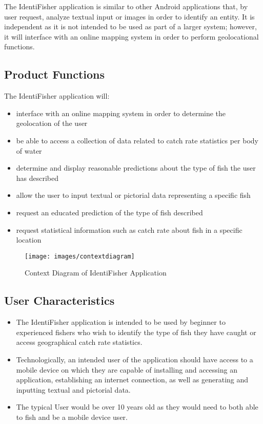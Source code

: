 \documentclass{article}
\begin{document}
The IdentiFisher application is similar to other Android applications that,
by user request, analyze textual input or images in order to identify
an entity. It is independent as it is not intended to be used as part
of a larger system; however, it will interface with an online mapping
system in order to perform geolocational functions.

\subsection{Product Functions}
The IdentiFisher application will: 
\begin{itemize}
	\item
	interface with an online mapping system in order to determine the geolocation of the user
	\item
	be able to access a collection of data related to catch rate statistics per body of water
	\item
	determine and display reasonable predictions about the type of fish the user has described
	\item
	allow the user to input textual or pictorial data representing a specific fish
	\item
	request an educated prediction of the type of fish described
	\item
	request statistical information such as catch rate about fish in a specific location
\end{itemize} 


\begin{figure}[H]
	\texttt{[image: images/contextdiagram]}
	\caption{Context Diagram of IdentiFisher Application}
\end{figure}


\subsection{User Characteristics}
\begin{itemize}
	\item
	The IdentiFisher application is intended to be used by beginner to experienced fishers who wish to identify the type of fish they have caught or access geographical catch rate statistics.

	\item
	Technologically, an intended user of the application should have access to a mobile device on which they are capable of installing and accessing an application, establishing an internet connection, as well as generating and inputting textual and pictorial data. 

	\item The typical User would be over 10 years old as they would need to both able to fish and be a mobile device user.
\end{itemize}
\end{document}
